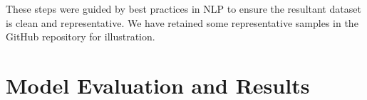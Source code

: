 \documentclass{article}
\begin{document}
These steps were guided by best practices in NLP to ensure the resultant dataset is clean and representative. We have retained some representative samples in the GitHub repository for illustration.

\section{Model Evaluation and Results}






\end{document}

